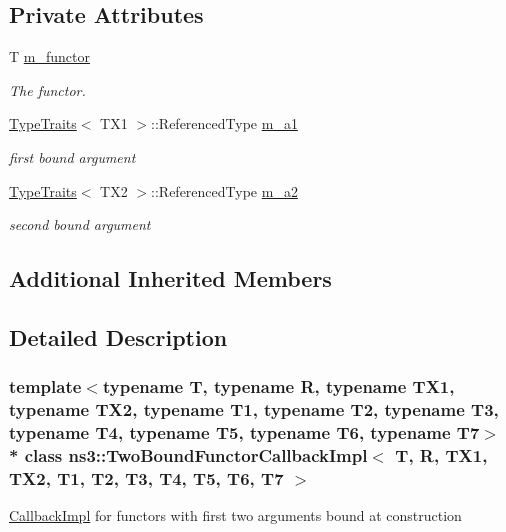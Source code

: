 \subsection*{Private Attributes}
\begin{DoxyCompactItemize}
\item 
T \hyperlink{classns3_1_1TwoBoundFunctorCallbackImpl_a5234eab89930da790dc2139129dcecb8}{m\+\_\+functor}
\begin{DoxyCompactList}\small\item\em The functor. \end{DoxyCompactList}\item 
\hyperlink{structTypeTraits}{Type\+Traits}$<$ T\+X1 $>$\+::Referenced\+Type \hyperlink{classns3_1_1TwoBoundFunctorCallbackImpl_a972666a7dde311627c08a002a10e3e7d}{m\+\_\+a1}
\begin{DoxyCompactList}\small\item\em first bound argument \end{DoxyCompactList}\item 
\hyperlink{structTypeTraits}{Type\+Traits}$<$ T\+X2 $>$\+::Referenced\+Type \hyperlink{classns3_1_1TwoBoundFunctorCallbackImpl_a502215e2ad5a97c79e0e46bf4f4ca153}{m\+\_\+a2}
\begin{DoxyCompactList}\small\item\em second bound argument \end{DoxyCompactList}\end{DoxyCompactItemize}
\subsection*{Additional Inherited Members}


\subsection{Detailed Description}
\subsubsection*{template$<$typename T, typename R, typename T\+X1, typename T\+X2, typename T1, typename T2, typename T3, typename T4, typename T5, typename T6, typename T7$>$\\*
class ns3\+::\+Two\+Bound\+Functor\+Callback\+Impl$<$ T, R, T\+X1, T\+X2, T1, T2, T3, T4, T5, T6, T7 $>$}

\hyperlink{classns3_1_1CallbackImpl}{Callback\+Impl} for functors with first two arguments bound at construction 


